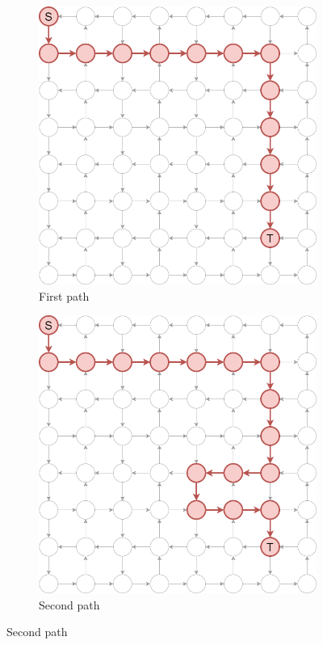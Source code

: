 \begin{figure}[ht]
\begin{subfigure}{.5\textwidth}
  \centering
\includegraphics[width=0.8\linewidth]{images/pathiterators/examples-Greedy DFS-1.png}
  \caption{First path}
\end{subfigure}
\begin{subfigure}{.5\textwidth}
  \centering
\includegraphics[width=0.8\linewidth]{images/pathiterators/examples-Greedy DFS-2.png}
  \caption{Second path}
\end{subfigure}


\end{figure}

